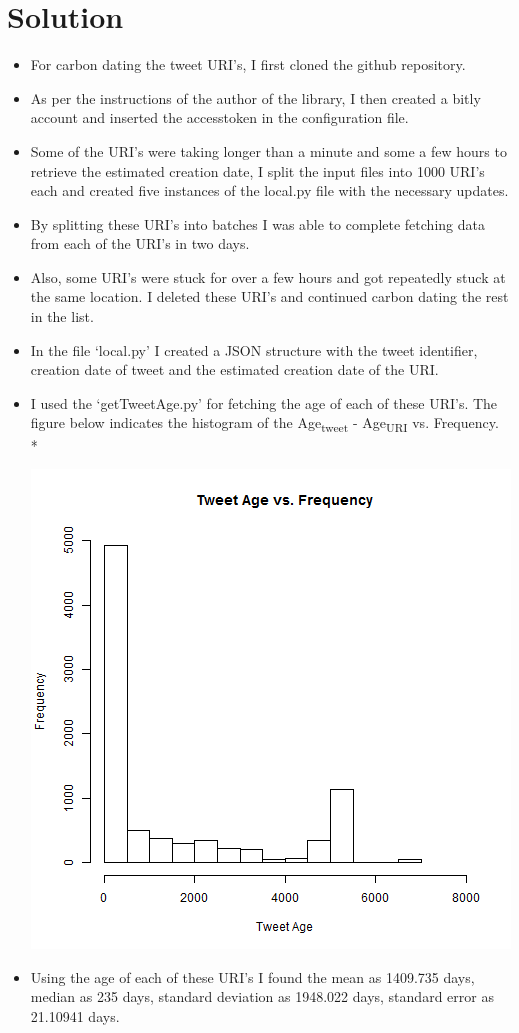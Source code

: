 \section{Solution}
\begin{itemize}
\item For carbon dating the tweet URI's, I first cloned the github repository.
\item As per the instructions of the author of the library, I then created a bitly account and inserted the accesstoken in the configuration file.
\item Some of the URI's were taking longer than a minute and some a few hours to retrieve the estimated creation date, I split the input files into 1000 URI's each and created five instances of the local.py file with the necessary updates.
\item By splitting these URI's into batches I was able to complete fetching data from each of the URI's in two days.
\item Also, some URI's were stuck for over a few hours and got repeatedly stuck at the same location. I deleted these URI's and continued carbon dating the rest in the list.
\item In the file `local.py' I created a JSON structure with the tweet identifier, creation date of tweet and the estimated creation date of the URI.
\item I used the `getTweetAge.py' for fetching the age of each of these URI's. The figure below indicates the histogram of the Age\textsubscript{tweet} - Age\textsubscript{URI} vs. Frequency.\\*
	\begin{minipage}{\linewidth}
		\centering
		\includegraphics[scale=0.55]{figures/tweetAge.png}
		\label{uriRedirect}
	\end{minipage}
\item Using the age of each of these URI's I found the mean as 1409.735 days, median as 235 days, standard deviation as 1948.022 days, standard error as 21.10941 days.
\end{itemize}
\newpage
